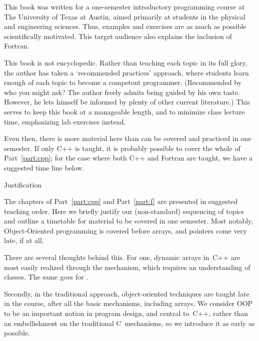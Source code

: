 
This book was written for a one-semester introductory programming course at The
University of Texas at Austin, aimed primarily at students in the
physical and engineering sciences. Thus, examples and exercises are as
much as possible scientifically motivated. This target audience also
explains the inclusion of Fortran.

This book is not encyclopedic. Rather than teaching each topic in its
full glory,
the author has taken a `recommended practices' approach, where students learn
enough of each topic to become a competent programmer.
(Recommended by who you might ask?
The author freely admits being guided by his own taste.
However, he lets himself be informed by plenty of other current literature.)
This serves to
keep this book at a manageable length, and to minimize class lecture
time, emphasizing lab exercises instead.

Even then, there is more material here than can be covered and
practiced in one semester. If only C++ is taught, it is probably
possible to cover the whole of Part~\ref{part:cpp}; for the case where
both C++ and Fortran are taught, we have a suggested time line below.

 {Justification}

The chapters of Part~\ref{part:cpp} and Part~\ref{part:f} are
presented in suggested teaching order. 
Here we briefly justify our (non-standard) sequencing of topics and
outline a timetable for material to be covered in one semester.
Most notably, Object-Oriented programming is covered
before arrays,
and pointers come very late, if at all.

There are several thoughts behind this. For one, dynamic arrays in~C++
are most easily realized through the  mechanism, which
requires an understanding of classes. The same goes for
.

Secondly, in the traditional approach, object-oriented techniques are
taught late in the course, after all the basic mechanisms, including
arrays. We consider OOP to be an important notion in program design,
and central to~C++, rather than an embellishment on the traditional
C~mechanisms, so we introduce it as early as possible.

